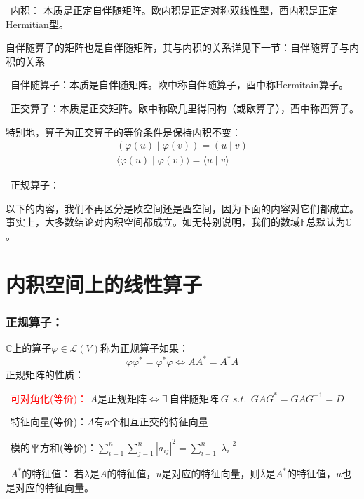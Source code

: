 \documentclass[zihao=5,UTF8]{report}
\def\F{\mathbb{F}}
\def\C{\mathbb{C}}
\theoremstyle{mystyle} %
\begin{document}
\par{}\  内积： 本质是正定自伴随矩阵。欧内积是正定对称双线性型，酉内积是正定Hermitian型。  \par
{\par\color{gray}\small
自伴随算子的矩阵也是自伴随矩阵，其与内积的关系详见下一节：自伴随算子与内积的关系
\par}
\  自伴随算子：本质是自伴随矩阵。欧中称自伴随算子，酉中称Hermitain算子。   \par
{}\  正交算子：本质是正交矩阵。欧中称欧几里得同构（或欧算子），酉中称酉算子。\par
特别地，算子{\color{red}为正交算子的等价条件是保持内积不变}：
\begin{gather*}
    (\varphi(u) \mid \varphi(v)) = (u\mid v)\\
    \langle \varphi(u)  \mid \varphi(v) \rangle = \langle u  \mid v \rangle
\end{gather*}  \par
{}\ 正规算子：


以下的内容，我们不再区分是欧空间还是酉空间，因为下面的内容对它们都成立。事实上，大多数结论对内积空间都成立。如无特别说明，我们的数域$\F$总默认为$\C$。


\section{内积空间上的线性算子}
\subsubsection{正规算子：}
$\mathbb{C}$上的算子$\varphi \in \mathscr{L}(V)$称为正规算子如果：
\begin{equation*}
    \varphi\varphi^* = \varphi^*\varphi \Longleftrightarrow AA^* = A^*A
\end{equation*}
正规矩阵的性质：
\par{}\  \textcolor{red}{可对角化(等价)：} $A$是正规矩阵$\Longleftrightarrow \exists\ \text{自伴随矩阵}\ G \ \ s.t.\ \ GAG^* = GAG^{-1} = D $  \par
{}\ 特征向量(等价)：$A$有$n$个相互正交的特征向量\par
{}\ 模的平方和(等价)：$\sum_{i=1}^{n}\sum_{j=1}^{n}\left| a_{ij} \right|^2 = \sum_{i=1}^{n}\left| \lambda_i \right|^2 $\par
{}\  $A^*$的特征值： 若$\lambda$是$A$的特征值，$u$是对应的特征向量，则$\overline{\lambda}$是$A^*$的特征值，$u$也是对应的特征向量。  \par
\end{document}
